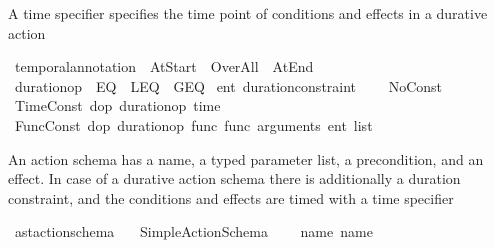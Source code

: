 \begin{isabellebody}
%
\isadelimdocument
%
\endisadelimdocument
%
\isatagdocument
%
\isamarkuptrue%
%
\endisatagdocument
{\isafolddocument}%
%
\isadelimdocument
%
\endisadelimdocument
%
\begin{isamarkuptext}%
A time specifier specifies the time point of conditions and effects in a durative action%
\end{isamarkuptext}\isamarkuptrue%
\isamarkupfalse%
\ temporal{\isacharunderscore}{\kern0pt}annotation\ {\isacharequal}{\kern0pt}\ At{\isacharunderscore}{\kern0pt}Start\ {\isacharbar}{\kern0pt}\ Over{\isacharunderscore}{\kern0pt}All\ {\isacharbar}{\kern0pt}\ At{\isacharunderscore}{\kern0pt}End\isanewline
\isanewline
{}\isamarkupfalse%
\ duration{\isacharunderscore}{\kern0pt}op\ {\isacharequal}{\kern0pt}\ EQ\ {\isacharbar}{\kern0pt}\ LEQ\ {\isacharbar}{\kern0pt}\ GEQ\isanewline
\isanewline
{}\isamarkupfalse%
\ {\isacharprime}{\kern0pt}ent\ duration{\isacharunderscore}{\kern0pt}constraint\ {\isacharequal}{\kern0pt}\ \isanewline
\ \ No{\isacharunderscore}{\kern0pt}Const\ \isanewline
{\isacharbar}{\kern0pt}\ Time{\isacharunderscore}{\kern0pt}Const\ {\isacharparenleft}{\kern0pt}d{\isacharunderscore}{\kern0pt}op{\isacharcolon}{\kern0pt}\ duration{\isacharunderscore}{\kern0pt}op{\isacharparenright}{\kern0pt}\ time\ \isanewline
{\isacharbar}{\kern0pt}\ Func{\isacharunderscore}{\kern0pt}Const\ {\isacharparenleft}{\kern0pt}d{\isacharunderscore}{\kern0pt}op{\isacharcolon}{\kern0pt}\ duration{\isacharunderscore}{\kern0pt}op{\isacharparenright}{\kern0pt}\ {\isacharparenleft}{\kern0pt}func{\isacharcolon}{\kern0pt}\ func{\isacharparenright}{\kern0pt}\ {\isacharparenleft}{\kern0pt}arguments{\isacharcolon}{\kern0pt}\ {\isachardoublequoteopen}{\isacharprime}{\kern0pt}ent\ list{\isachardoublequoteclose}{\isacharparenright}{\kern0pt}%
\begin{isamarkuptext}%
An action schema has a name, a typed parameter list, a precondition,
  and an effect. In case of a durative action schema there is additionally a 
  duration constraint, and the conditions and effects are timed with a time specifier%
\end{isamarkuptext}\isamarkuptrue%
\isamarkupfalse%
\ ast{\isacharunderscore}{\kern0pt}action{\isacharunderscore}{\kern0pt}schema\ {\isacharequal}{\kern0pt}\isanewline
\ \ Simple{\isacharunderscore}{\kern0pt}Action{\isacharunderscore}{\kern0pt}Schema\isanewline
\ \ \ \ {\isacharparenleft}{\kern0pt}name{\isacharcolon}{\kern0pt}\ name{\isacharparenright}{\kern0pt}\isanewline

\end{isabellebody}
